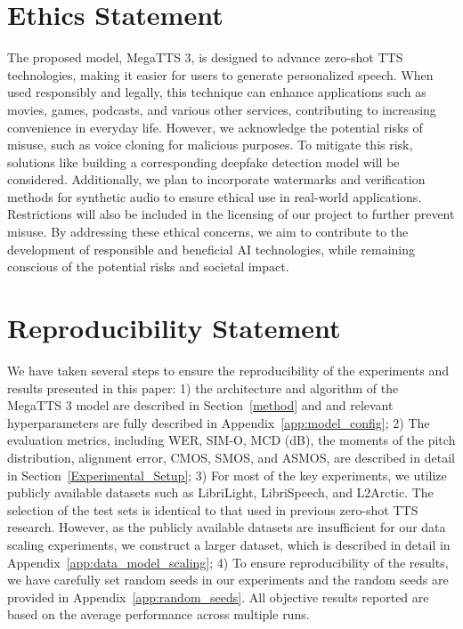\section{Ethics Statement}
\label{sec:ethics_statement}
The proposed model, MegaTTS 3, is designed to advance zero-shot TTS technologies, making it easier for users to generate personalized speech. When used responsibly and legally, this technique can enhance applications such as movies, games, podcasts, and various other services, contributing to increasing convenience in everyday life. However, we acknowledge the potential risks of misuse, such as voice cloning for malicious purposes. To mitigate this risk, solutions like building a corresponding deepfake detection model will be considered. Additionally, we plan to incorporate watermarks and verification methods for synthetic audio to ensure ethical use in real-world applications. Restrictions will also be included in the licensing of our project to further prevent misuse. By addressing these ethical concerns, we aim to contribute to the development of responsible and beneficial AI technologies, while remaining conscious of the potential risks and societal impact.


\section{Reproducibility Statement}
\label{sec:reproducibility_statement}
We have taken several steps to ensure the reproducibility of the experiments and results presented in this paper: 1) the architecture and algorithm of the MegaTTS 3 model are described in Section~\ref{method} and and relevant hyperparameters are fully described in Appendix~\ref{app:model_config}; 2) The evaluation metrics, including WER, SIM-O, MCD (dB), the moments of the pitch distribution, alignment error, CMOS, SMOS, and ASMOS, are described in detail in Section~\ref{Experimental_Setup}; 3) For most of the key experiments, we utilize publicly available datasets such as LibriLight, LibriSpeech, and L2Arctic. The selection of the test sets is identical to that used in previous zero-shot TTS research. However, as the publicly available datasets are insufficient for our data scaling experiments, we construct a larger dataset, which is described in detail in Appendix~\ref{app:data_model_scaling}; 4) To ensure reproducibility of the results, we have carefully set random seeds in our experiments and the random seeds are provided in Appendix~\ref{app:random_seeds}. All objective results reported are based on the average performance across multiple runs.


